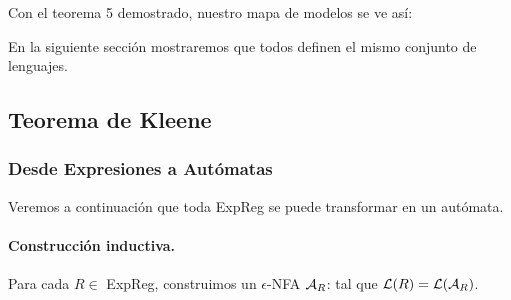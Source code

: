 Con el teorema 5 demostrado, nuestro mapa de modelos se ve así:

En la siguiente sección mostraremos que todos definen el mismo conjunto de lenguajes.

\newpage

\subsection{Teorema de Kleene}

\subsubsection{Desde Expresiones a Autómatas}

Veremos a continuación que toda ExpReg se puede transformar en un autómata.

\paragraph{Construcción inductiva.} Para cada $R \in$ ExpReg, construimos un $\epsilon$-NFA $\mathcal{A}_R$:
tal que $\mathcal{L}(R) = \mathcal{L}(\mathcal{A}_R)$.
